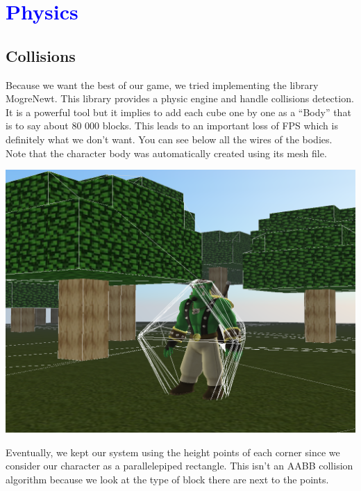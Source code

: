 \documentclass[article]{report}             %
\begin{document}
		\chapter{\textcolor{blue}{Physics}}
			\section{Collisions}
				Because we want the best of our game, we tried implementing the library MogreNewt. This library provides a physic engine and handle collisions detection. It is a powerful tool but it implies to add each cube one by one as a \enquote{Body} that is to say about 80 000 blocks. This leads to an important loss of FPS which is definitely what we don't want. You can see below all the wires of the bodies. Note that the character body was automatically created using its mesh file.\\
			\begin{center}
				\includegraphics[width = 14cm]{images/MogreNewtWires.png}	
			\end{center}	

Eventually, we kept our system using the height points of each corner since we consider our character as a parallelepiped rectangle. This isn't an AABB collision algorithm because we look at the type of block there are next to the points.
\end{document}
